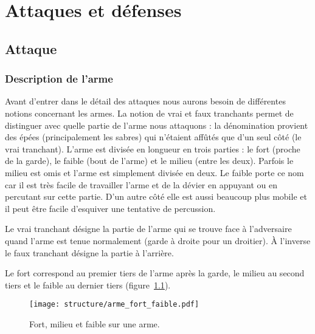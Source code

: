 \chapter{Attaques et défenses}


\section{Attaque}
\label{sec:att-def:attaque}


\subsection{Description de l'arme}


Avant d'entrer dans le détail des attaques nous aurons besoin de différentes notions concernant les armes.
La notion de vrai et faux tranchants permet de distinguer avec quelle partie de l'arme nous attaquons : la dénomination provient des épées (principalement les sabres) qui n'étaient affûtés que d'un seul côté (le vrai tranchant).
L'arme est divisée en longueur en trois parties : le fort (proche de la garde), le faible (bout de l'arme) et le milieu (entre les deux).
Parfois le milieu est omis et l'arme est simplement divisée en deux.
Le faible porte ce nom car il est très facile de travailler l'arme et de la dévier en appuyant ou en percutant sur cette partie.
D'un autre côté elle est aussi beaucoup plus mobile et il peut être facile d'esquiver une tentative de percussion.


\begin{definition}
\label{att:def:tranchant}

Le vrai tranchant désigne la partie de l'arme qui se trouve face à l'adversaire quand l'arme est tenue normalement (garde à droite pour un droitier).
À l'inverse le faux tranchant désigne la partie à l'arrière.
\end{definition}


\begin{definition}
\label{att:def:fort-faible}

Le fort correspond au premier tiers de l'arme après la garde, le milieu au second tiers et le faible au dernier tiers (figure~\ref{att:fig:arme-fort-faible}).
\end{definition}


\begin{figure}[ht]
	\centering
	\texttt{[image: structure/arme\_fort\_faible.pdf]}
	\caption{Fort, milieu et faible sur une arme.}
	\label{att:fig:arme-fort-faible}
\end{figure}



